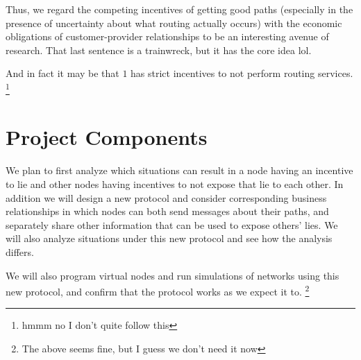 \documentclass[12pt]{article}
\begin{document}
  Thus, we regard the competing incentives of getting good paths
  (especially in the presence of uncertainty about what routing actually occurs)
  with the economic obligations of customer-provider relationships
  to be an interesting avenue of research.
  That last sentence is a trainwreck, but it has the core idea lol.

  And in fact it may be that $1$ has strict incentives to not perform routing services.
  \footnote{hmmm no I don't quite follow this}

  \section{Project Components}
  We plan to first analyze which situations can result in a node having an incentive to lie and other nodes having incentives to not expose that lie to each other. In addition we will design a new protocol and consider corresponding business relationships in which nodes can both send messages about their paths, and separately share other information that can be used to expose others' lies. We will also analyze situations under this new protocol and see how the analysis differs.
  
  We will also program virtual nodes and run simulations of networks using this new protocol, and confirm that the protocol works as we expect it to.
  \footnote{The above seems fine, but I guess we don't need it now}




{}

\end{document}
